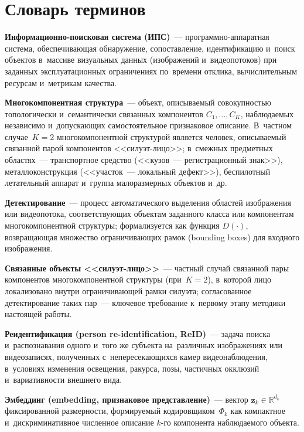 \chapter*{Словарь терминов}             %

\textbf{Информационно-поисковая система (ИПС)}~--- программно-аппаратная
система, обеспечивающая обнаружение, сопоставление, идентификацию и~поиск
объектов в~массиве визуальных данных (изображений и~видеопотоков) при
заданных эксплуатационных ограничениях по~времени отклика,
вычислительным ресурсам и~метрикам качества.

\textbf{Многокомпонентная структура}~--- объект, описываемый совокупностью
топологически и~семантически связанных компонентов $C_1,\ldots,C_K$,
наблюдаемых независимо и~допускающих самостоятельное признаковое
описание. В~частном случае~$K=2$ многокомпонентной структурой является
человек, описываемый связанной парой компонентов <<силуэт-лицо>>;
в~смежных предметных областях~--- транспортное средство (<<кузов~---
регистрационный знак>>), металлоконструкция (<<участок~--- локальный
дефект>>), беспилотный летательный аппарат и~группа малоразмерных
объектов и~др.

\textbf{Детектирование}~--- процесс автоматического выделения областей
изображения или видеопотока, соответствующих объектам заданного класса
или компонентам многокомпонентной структуры; формализуется как функция
$D(\cdot)$, возвращающая множество ограничивающих рамок (bounding boxes)
для входного изображения.

\textbf{Связанные объекты <<силуэт-лицо>>}~--- частный случай связанной
пары компонентов многокомпонентной структуры (при~$K=2$), в~которой
лицо локализовано внутри ограничивающей рамки силуэта; согласованное
детектирование таких пар~--- ключевое требование к~первому этапу
методики настоящей работы.

\textbf{Реидентификация (person re-identification, ReID)}~--- задача
поиска и~распознавания одного и~того же субъекта на~различных
изображениях или видеозаписях, полученных с~непересекающихся камер
видеонаблюдения, в~условиях изменения освещения, ракурса, позы,
частичных окклюзий и~вариативности внешнего вида.

\textbf{Эмбеддинг (embedding, признаковое представление)}~--- вектор
$\mathbf{z}_k\in\mathbb{R}^{d_k}$ фиксированной размерности, формируемый
кодировщиком~$\Phi_k$ как компактное и~дискриминативное численное
описание $k$-го компонента наблюдаемого объекта.

